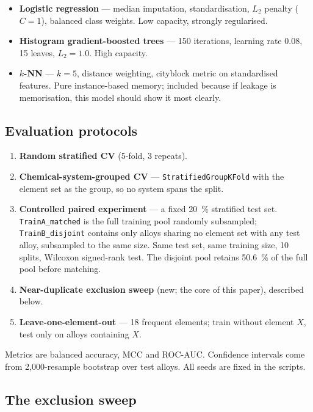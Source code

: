 \documentclass[11pt]{article}
\begin{document}
\begin{itemize}
\item \textbf{Logistic regression} --- median imputation, standardisation, $L_2$ penalty ($C=1$), balanced class weights. Low capacity, strongly regularised.
\item \textbf{Histogram gradient-boosted trees} --- 150 iterations, learning rate 0.08, 15 leaves, $L_2 = 1.0$. High capacity.
\item \textbf{$k$-NN} --- $k=5$, distance weighting, cityblock metric on standardised features. Pure instance-based memory; included because if leakage is memorisation, this model should show it most clearly.
\end{itemize}

\subsection{Evaluation protocols}

\begin{enumerate}
\item \textbf{Random stratified CV} (5-fold, 3 repeats).
\item \textbf{Chemical-system-grouped CV} --- \texttt{StratifiedGroupKFold} with the element set as the group, so no system spans the split.
\item \textbf{Controlled paired experiment} --- a fixed \SI{20}{\percent} stratified test set. \texttt{TrainA\_matched} is the full training pool randomly subsampled; \texttt{TrainB\_disjoint} contains only alloys sharing no element set with any test alloy, subsampled to the same size. Same test set, same training size, 10 splits, Wilcoxon signed-rank test. The disjoint pool retains \SI{50.6}{\percent} of the full pool before matching.
\item \textbf{Near-duplicate exclusion sweep} (new; the core of this paper), described below.
\item \textbf{Leave-one-element-out} --- 18 frequent elements; train without element $X$, test only on alloys containing $X$.
\end{enumerate}

Metrics are balanced accuracy, MCC and ROC-AUC. Confidence intervals come from 2{,}000-resample bootstrap over test alloys. All seeds are fixed in the scripts.

\subsection{The exclusion sweep}
\end{document}

